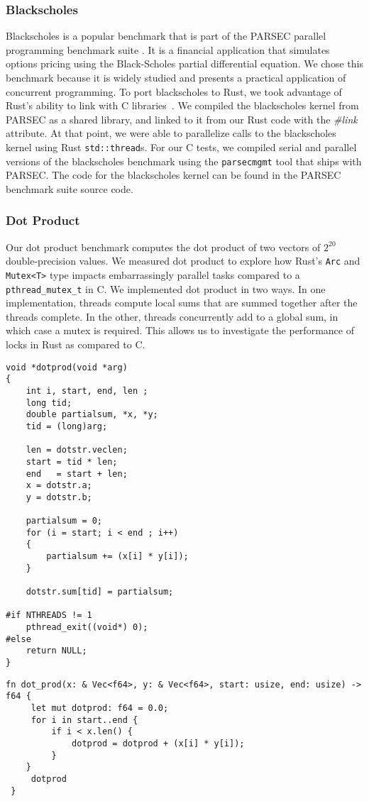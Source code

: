 \subsubsection{Blackscholes}
Blackscholes is a popular benchmark that is part of the PARSEC parallel programming benchmark suite \cite{parsec}. It is a financial application that simulates options pricing using the Black-Scholes partial differential equation. We chose this benchmark because it is widely studied and presents a practical application of concurrent programming.
To port blackscholes to Rust, we took advantage of Rust's ability to link with C libraries~\cite{rustlinking}. We compiled the blackscholes kernel from PARSEC as a shared library, and linked to it from our Rust code with the \textit{\#link} attribute. At that point, we were able to parallelize calls to the blackscholes kernel using Rust \texttt{std::thread}s.
For our C tests, we compiled serial and parallel versions of the blackscholes benchmark using the \texttt{parsecmgmt} tool that ships with PARSEC.
The code for the blackscholes kernel can be found in the PARSEC benchmark suite source code.

\subsubsection{Dot Product}
Our dot product benchmark computes the dot product of two vectors of $2^{20}$ double-precision values. We measured dot product to explore how Rust's \texttt{Arc} and \texttt{Mutex<T>} type impacts embarrassingly parallel tasks compared to a \texttt{pthread\_mutex\_t} in C. We implemented dot product in two ways. In one implementation, threads compute local sums that are summed together after the threads complete. In the other, threads concurrently add to a global sum, in which case a mutex is required. This allows us to investigate the performance of locks in Rust as compared to C. 


\begin{lstlisting}[caption={Dot Product C Kernel}]
void *dotprod(void *arg)
{
    int i, start, end, len ;
    long tid;
    double partialsum, *x, *y;
    tid = (long)arg;

    len = dotstr.veclen;
    start = tid * len;
    end   = start + len;
    x = dotstr.a;
    y = dotstr.b;

    partialsum = 0;
    for (i = start; i < end ; i++)
    {
        partialsum += (x[i] * y[i]);
    }

    dotstr.sum[tid] = partialsum;

#if NTHREADS != 1
    pthread_exit((void*) 0);
#else
    return NULL;
}
\end{lstlisting}

\begin{lstlisting}[caption={Dot Product Rust Kernel}]
fn dot_prod(x: & Vec<f64>, y: & Vec<f64>, start: usize, end: usize) -> f64 {
     let mut dotprod: f64 = 0.0;
     for i in start..end {
         if i < x.len() {
             dotprod = dotprod + (x[i] * y[i]);
         }
    }
     dotprod
 }
\end{lstlisting}